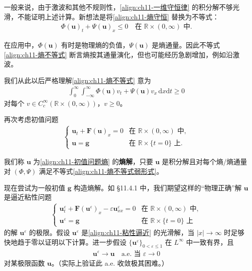 \documentclass[../../main.tex]{subfiles}
\begin{document}
一般来说，由于激波和其他不规则性，\eqref{align:ch11-一维守恒律} 的积分解不够光滑，不能证明上述计算。新想法是将\eqref{align:ch11-熵守恒} 替换为不等式：
\begin{align}
\Phi(\mathbf{u})_t+\Psi(\mathbf{u})_x\leqslant 0 \quad \text{在 } \mathbb{R}\times(0,\infty) \text{ 中}.
\label{align:ch11-熵不等式}
\end{align}

在应用中，$\Phi(\mathbf{u})$ 有时是物理熵的负值，$\Psi(\mathbf{u})$ 是熵通量。因此不等式\eqref{align:ch11-熵不等式} 断言熵按其通量演化，但也可能经历急剧增加，例如沿激波。

我们从此以后严格理解\eqref{align:ch11-熵不等式} 意为
\begin{align}
\int_0^\infty\int_{-\infty}^\infty \Phi(\mathbf{u})v_t+\Psi(\mathbf{u})v_x\,\mathrm{d}x\mathrm{d}t\geqslant 0
\label{align:ch11-熵不等式弱形式}
\end{align}
对每个 $v\in C_c^\infty(\mathbb{R}\times(0,\infty))$，$v\geqslant 0$。

再次考虑初值问题
\begin{align}
\begin{cases}
\mathbf{u}_t+\mathbf{F}(\mathbf{u})_x=0 & \text{在 } \mathbb{R}\times(0,\infty) \text{ 中},\\
\mathbf{u}=\mathbf{g} & \text{在 } \mathbb{R}\times\{t=0\} \text{ 上}.
\end{cases}
\label{align:ch11-初值问题熵}
\end{align}

\begin{definition}\label{definition:ch11-熵解}
我们称 $\mathbf{u}$ 为\eqref{align:ch11-初值问题熵} 的\textbf{熵解}，只要 $\mathbf{u}$ 是积分解且对每个熵/熵通量对 $(\Phi,\Psi)$ 满足不等式\eqref{align:ch11-熵不等式弱形式}。
\end{definition}

现在尝试为一般初值 $\mathbf{g}$ 构造熵解。如 \S11.4.1 中，我们期望这样的``物理正确''解 $\mathbf{u}$ 是逼近粘性问题
\begin{align}
\begin{cases}
\mathbf{u}^\varepsilon_t+\mathbf{F}(\mathbf{u}^\varepsilon)_x-\varepsilon\mathbf{u}^\varepsilon_{xx}=0 & \text{在 } \mathbb{R}\times(0,\infty) \text{ 中},\\
\mathbf{u}^\varepsilon=\mathbf{g} & \text{在 } \mathbb{R}\times\{t=0\} \text{ 上}
\end{cases}
\label{align:ch11-粘性逼近}
\end{align}
的解 $\mathbf{u}^\varepsilon$ 的极限。假设 $\mathbf{u}^\varepsilon$ 是\eqref{align:ch11-粘性逼近} 的光滑解，当 $|x|\to\infty$ 时足够快地趋于零以证明以下计算。进一步假设 $\{\mathbf{u}^\varepsilon\}_{0<\varepsilon\leqslant 1}$ 在 $L^\infty$ 中一致有界，且
\begin{align}
\mathbf{u}^\varepsilon\to\mathbf{u} \quad \text{a.e. 当 } \varepsilon\to 0
\label{align:ch11-ae收敛}
\end{align}
对某极限函数 $\mathbf{u}$。（实际上验证此 a.e. 收敛极其困难。）
\end{document}
